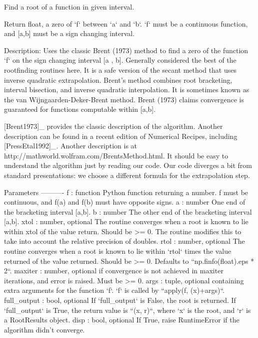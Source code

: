 \begin{DoxyVerb}Find a root of a function in given interval.

Return float, a zero of `f` between `a` and `b`.  `f` must be a continuous
function, and [a,b] must be a sign changing interval.

Description:
Uses the classic Brent (1973) method to find a zero of the function `f` on
the sign changing interval [a , b].  Generally considered the best of the
rootfinding routines here.  It is a safe version of the secant method that
uses inverse quadratic extrapolation.  Brent's method combines root
bracketing, interval bisection, and inverse quadratic interpolation.  It is
sometimes known as the van Wijngaarden-Deker-Brent method.  Brent (1973)
claims convergence is guaranteed for functions computable within [a,b].

[Brent1973]_ provides the classic description of the algorithm.  Another
description can be found in a recent edition of Numerical Recipes, including
[PressEtal1992]_.  Another description is at
http://mathworld.wolfram.com/BrentsMethod.html.  It should be easy to
understand the algorithm just by reading our code.  Our code diverges a bit
from standard presentations: we choose a different formula for the
extrapolation step.

Parameters
----------
f : function
    Python function returning a number.  f must be continuous, and f(a) and
    f(b) must have opposite signs.
a : number
    One end of the bracketing interval [a,b].
b : number
    The other end of the bracketing interval [a,b].
xtol : number, optional
    The routine converges when a root is known to lie within xtol of the
    value return. Should be >= 0.  The routine modifies this to take into
    account the relative precision of doubles.
rtol : number, optional
    The routine converges when a root is known to lie within `rtol` times
    the value returned of the value returned. Should be >= 0. Defaults to
    ``np.finfo(float).eps * 2``.
maxiter : number, optional
    if convergence is not achieved in maxiter iterations, and error is
    raised.  Must be >= 0.
args : tuple, optional
    containing extra arguments for the function `f`.
    `f` is called by ``apply(f, (x)+args)``.
full_output : bool, optional
    If `full_output` is False, the root is returned.  If `full_output` is
    True, the return value is ``(x, r)``, where `x` is the root, and `r` is
    a RootResults object.
disp : bool, optional
    If True, raise RuntimeError if the algorithm didn't converge.


\end{DoxyVerb}
